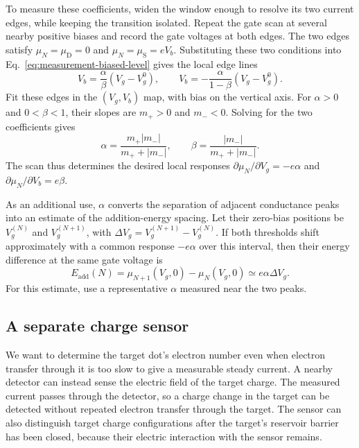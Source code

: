 To measure these coefficients, widen the window enough to resolve
its two current edges, while keeping the transition isolated.
Repeat the gate scan at several nearby positive biases and record
the gate voltages at both edges. The two edges satisfy
$\mu_N=\mu_{\mathrm D}=0$ and $\mu_N=\mu_{\mathrm S}=eV_b$.
Substituting these two conditions into
Eq.~\eqref{eq:measurement-biased-level} gives the local edge lines
\begin{equation}
 V_b=\frac{\alpha}{\beta}(V_g-V_g^0),\qquad
 V_b=-\frac{\alpha}{1-\beta}(V_g-V_g^0).
 \label{eq:measurement-diamond-slopes}
\end{equation}
Fit these edges in the $(V_g,V_b)$ map, with bias on the vertical
axis. For $\alpha>0$ and $0<\beta<1$, their slopes are
$m_+>0$ and $m_-<0$. Solving for the two coefficients gives
\begin{equation}
 \alpha=\frac{m_+|m_-|}{m_++|m_-|},\qquad
 \beta=\frac{|m_-|}{m_++|m_-|}.
 \label{eq:measurement-lever-arm-calibration}
\end{equation}
The scan thus determines the desired local responses
$\partial\mu_N/\partial V_g=-e\alpha$ and
$\partial\mu_N/\partial V_b=e\beta$.

As an additional use, $\alpha$ converts the separation of adjacent
conductance peaks into an estimate of the addition-energy spacing.
Let their zero-bias positions be $V_g^{(N)}$ and $V_g^{(N+1)}$,
with $\Delta V_g=V_g^{(N+1)}-V_g^{(N)}$. If both thresholds shift
approximately with a common response $-e\alpha$ over this interval,
then their energy difference at the same gate voltage is
\[
 E_{\mathrm{add}}(N)
 =\mu_{N+1}(V_g,0)-\mu_N(V_g,0)
 \simeq e\alpha\Delta V_g.
\]
For this estimate, use a representative $\alpha$ measured near
the two peaks.

\subsection{A separate charge sensor}
\label{sec:measurement-charge-sensor}

We want to determine the target dot's electron number even when
electron transfer through it is too slow to give a measurable
steady current. A nearby detector can instead sense the electric
field of the target charge. The measured current passes through
the detector, so a charge change in the target can be detected
without repeated electron transfer through the target.
The sensor can also distinguish target charge configurations after
the target's reservoir barrier has been closed, because their
electric interaction with the sensor remains.

